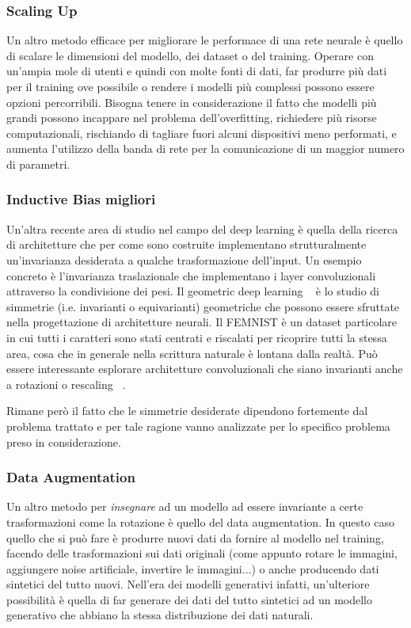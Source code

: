 \subsubsection{Scaling Up}
Un altro metodo efficace per migliorare le performace di una rete neurale 
è quello di scalare le dimensioni del modello, dei dataset o del training.
Operare con un'ampia mole di utenti e quindi con molte fonti di dati,
far produrre più dati per il training ove possibile o rendere i modelli 
più complessi possono essere opzioni percorribili. Bisogna tenere in 
considerazione il fatto che modelli più grandi possono incappare nel 
problema dell'overfitting, richiedere più risorse computazionali, 
rischiando di tagliare fuori alcuni dispositivi meno performati, e 
aumenta l'utilizzo della banda di rete per la comunicazione di un 
maggior numero di parametri.


\subsubsection{Inductive Bias migliori}
Un'altra recente area di studio nel campo del deep learning è quella 
della ricerca di architetture che per come sono costruite implementano
strutturalmente un'invarianza desiderata a qualche trasformazione 
dell'input. Un esempio concreto è l'invarianza traslazionale che 
implementano i layer convoluzionali attraverso la condivisione dei pesi.
Il geometric deep learning ~\cite{bronstein2021geometric} è lo studio di simmetrie 
(i.e. invarianti o equivarianti) geometriche che possono essere sfruttate nella 
progettazione di architetture neurali.
Il FEMNIST è un dataset particolare in cui tutti i caratteri sono stati
centrati e riscalati per ricoprire tutti la stessa area, cosa che in 
generale nella scrittura naturale è lontana dalla realtà. Può essere 
interessante esplorare architetture convoluzionali che siano invarianti 
anche a rotazioni o rescaling ~\cite{sosnovik2023symmetry, cohen2016group,
marcos2016rotation, cohen2016steer}.

Rimane però il fatto che le simmetrie desiderate dipendono fortemente 
dal problema trattato e per tale ragione vanno analizzate per lo 
specifico problema preso in considerazione.


\subsubsection{Data Augmentation}
Un altro metodo per \textit{insegnare} ad un modello ad essere invariante
a certe trasformazioni come la rotazione è quello del data augmentation.
In questo caso quello che si può fare è produrre nuovi dati da fornire
al modello nel training, facendo delle trasformazioni sui dati 
originali (come appunto rotare le immagini, aggiungere noise artificiale,
invertire le immagini...) o anche producendo dati sintetici del tutto
nuovi. Nell'era dei modelli generativi infatti, un'ulteriore possibilità
è quella di far generare dei dati del tutto sintetici ad un modello 
generativo che abbiano la stessa distribuzione dei dati naturali.

